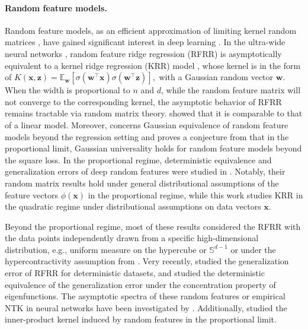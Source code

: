 \documentclass[twoside,11pt]{article}
\def\bx{{\boldsymbol x}}
\def\bz{{\boldsymbol z}}
\newcommand{\x}{\boldsymbol{x}}
\newcommand{\z}{\boldsymbol{z}}
\newcommand{\w}{\mbi{w}}
\newcommand{\1}{\mathbf{1}}
\def\mbi#1{\boldsymbol{#1}}
\def\mbi#1{\boldsymbol{#1}} %
\def\tran{^\top}
\newcommand{\Exp}{\mathbb{E}}
\begin{document}
\paragraph{Random feature models.} Random feature models, as an efficient approximation of limiting kernel random matrices \citep{rahimi2007random,liu2021random}, have gained significant interest in deep learning \citep{pennington2017nonlinear,louart2018random}. In the ultra-wide neural networks \citep{arora2019exact}, random feature ridge regression (RFRR) is asymptotically equivalent to a kernel ridge regression (KRR) model  \citep{jacot2018neural,novak2018bayesian,matthews2018gaussian,wang2021deformed,wang2023overparameterized}, whose kernel is in the form of $K(\bx,\bz) = \Exp_{\w}[\sigma(\w\tran \x)\sigma(\w\tran \z)],$ with a Gaussian random vector $\w$. When the width is proportional to $n$ and $d$, while the random feature matrix will not converge to the corresponding kernel, the asymptotic behavior of RFRR remains tractable via random matrix theory. \cite{mei2019generalization,adlam2020neural,liao2020random,gerace2020generalisation,goldt2022gaussian,hu2020universality} showed that it is comparable to that of a linear model. Moreover, \cite{hu2020universality} concerns Gaussian equivalence of random feature models beyond the regression setting and
proves a conjecture from \cite{gerace2020generalisation,goldt2022gaussian}  that in the proportional limit, Gaussian universality holds for random feature models beyond the square loss. In the proportional regime, deterministic equivalence and generalization errors of deep random features were studied in \citep{schroder2023deterministic,schroder2024asymptotic}. Notably, their random matrix results hold under general distributional assumptions of the feature vectors $\phi(\bx)$ in the proportional regime, while this work studies KRR in the quadratic regime under distributional assumptions on data vectors $\bx$.

Beyond the proportional regime, most of these results considered the RFRR with the data points independently drawn from a specific high-dimensional distribution, e.g., uniform measure on the hypercube or $\mathbb{S}^{d-1}$ \citep{ghorbani2021linearized,hu2024asymptotics} or under the hypercontractivity assumption from \cite{mei2021generalization}. 
Very recently, \cite{latourelle2023matrix} studied the generalization error of RFRR for deterministic datasets, and \cite{defilippis2024dimension} studied the deterministic equivalence of the generalization error under the concentration property of eigenfunctions.
The asymptotic spectra of these random features or empirical NTK in neural networks have been investigated by
\cite{pennington2017nonlinear,louart2018random,mei2019generalization,fan2020spectra,benigni2019eigenvalue,benigni2022largest,wang2021deformed,wang2024nonlinear,benigni2025eigenvalue,liao2025random}. Additionally, \cite{liao2018spectrum} studied the inner-product kernel induced by random features in the proportional limit. 
\end{document}

